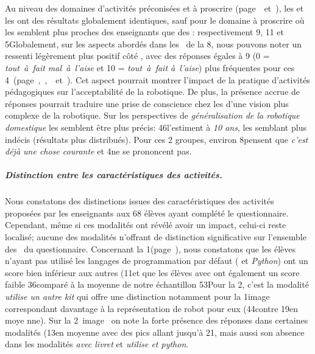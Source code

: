             Au niveau des domaines d'activités préconisées et à proscrire ({\footnotesize page~\pageref{QA6}~et~\pageref{QA7}}), les  et les  ont des résultats globalement identiques, sauf pour le domaine à proscrire  où les  semblent plus proches des enseignants que des : respectivement 9, 11 et 5\prc[.]
            Globalement, sur les aspects abordés dans les~ de la 8\ieme {}, nous pouvons noter un ressenti légèrement plus positif côté , avec des réponses égales à 9  (0 = \textit{tout~à~fait mal~à~l'aise} et 10 = \textit{tout~à~fait à~l'aise}) plus fréquentes pour ces 4~({\footnotesize page~\pageref{QA8-1},~\pageref{QA8-2},~\pageref{QA8-3}~et~\pageref{QA8-4}}). 
            Cet aspect pourrait montrer l'impact de la pratique d'activités pédagogiques sur l'acceptabilité de la robotique. De plus, la présence accrue de réponses  pourrait traduire une prise de conscience chez les  d'une vision plus complexe de la robotique.
            Sur les perspectives de \textit{généralisation de la robotique domestique} les  semblent être plus précis: 46\prc l'estiment à \textit{10 ans}, les  semblant plus indécis (résultats plus distribués). Pour ces 2 groupes, environ 8\prc pensent que \textit{c'est déjà une chose courante} et 4\prc ne se prononcent pas.
          \subparagraph{Distinction entre les caractéristiques des activités.}
            Nous constatons des distinctions issues des caractéristiques des activités proposées par les enseignants aux $68$ élèves ayant complété le questionnaire. 
            Cependant, même si ces modalités ont révélé avoir un impact, celui-ci reste localisé; aucune des modalités n'offrant de distinction significative sur l'ensemble des~ du questionnaire.
            Concernant la 1\iere {}({\footnotesize page~\pageref{QA1}}), nous constatons que les élèves n'ayant pas utilisé les langages de programmation par défaut ( et \textit{Python}) ont un score bien inférieur aux autres (11\prc[)] et que les élèves  avec  ont également un score faible 36\prc comparé à la moyenne de notre échantillon 53\prc[.]
            Pour la 2\ieme, c'est la modalité \textit{utilise un autre kit} qui offre une distinction notamment pour la 1\iere image~ correspondant davantage à la représentation de robot pour eux (44\prc contre 19\prc en moye nne).
            Sur la 2\nde~image~ on note la forte présence des réponses  dans certaines modalités (13\prc en moyenne avec des pics allant jusqu'à 21\prc[)], mais aussi son absence dans les modalités \textit{avec livret} et \textit{utilise  et python}.
